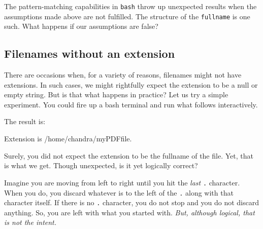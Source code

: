 \documentclass[
  a4paper,
]{article}
\newenvironment{Shaded}{\begin{snugshade}}{\end{snugshade}}
\newcommand{\AttributeTok}[1]{\textcolor[rgb]{0.80,0.80,0.80}{#1}}
\newcommand{\BuiltInTok}[1]{\textcolor[rgb]{0.80,0.80,0.80}{#1}}
\newcommand{\CommentTok}[1]{\textcolor[rgb]{0.50,0.62,0.50}{#1}}
\newcommand{\ExtensionTok}[1]{\textcolor[rgb]{0.80,0.80,0.80}{#1}}
\newcommand{\NormalTok}[1]{\textcolor[rgb]{0.80,0.80,0.80}{#1}}
\newcommand{\OperatorTok}[1]{\textcolor[rgb]{0.94,0.94,0.82}{#1}}
\newcommand{\PreprocessorTok}[1]{\textcolor[rgb]{1.00,0.81,0.69}{\textbf{#1}}}
\newcommand{\StringTok}[1]{\textcolor[rgb]{0.80,0.58,0.58}{#1}}
\newcommand{\VariableTok}[1]{\textcolor[rgb]{0.80,0.80,0.80}{#1}}
\begin{document}
The pattern-matching capabilities in \texttt{bash} throw up unexpected
results when the assumptions made above are not fulfilled. The structure
of the \texttt{fullname} is one such. What happens if our assumptions
are false?

\hypertarget{filenames-without-an-extension}{%
\subsection{Filenames without an
extension}\label{filenames-without-an-extension}}

There are occasions when, for a variety of reasons, filenames might not
have extensions. In such cases, we might rightfully expect the extension
to be a null or empty string. But is that what happens in practice? Let
us try a simple experiment. You could fire up a bash terminal and run
what follows interactively.

\begin{Shaded}
\end{Shaded}

The result is:

\begin{Shaded}
\begin{Highlighting}[]
\ExtensionTok{Extension}\NormalTok{ is /home/chandra/myPDFfile.}
\end{Highlighting}
\end{Shaded}

Surely, you did not expect the extension to be the fullname of the file.
Yet, that is what we get. Though unexpected, is it yet logically
correct?

Imagine you are moving from left to right until you hit the \emph{last}
\texttt{.} character. When you do, you discard whatever is to the left
of the \texttt{.} along with that character itself. If there is no
\texttt{.} character, you do not stop and you do not discard anything.
So, you are left with what you started with. \emph{But, although
logical, that is not the intent.}
\end{document}
